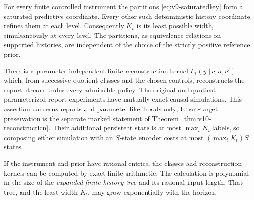 \begin{theorem}
\label{thm:v9-saturation}
For every finite controlled instrument the partitions
\eqref{eq:v9-saturatedkey} form a saturated predictive coordinate. Every
other such deterministic history coordinate refines them at each level.
Consequently $K_t$ is its least possible width, simultaneously at every
level. The partitions, as equivalence relations on supported histories,
are independent of the choice of the strictly positive reference prior.

There is a parameter-independent finite reconstruction kernel
$L_t(y\mid c,a,c')$ which, from successive quotient classes and the
chosen controls, reconstructs the report stream under every admissible
policy. The original and quotient parameterized report experiments have
mutually exact causal simulations. This assertion concerns reports and
parameter likelihoods only; latent-target preservation is the separate
marked statement of Theorem~\ref{thm:v10-reconstruction}. Their additional persistent state is at most
$\max_tK_t$ labels, so composing either simulation with an $S$-state
encoder costs at most $(\max_tK_t)S$ states.

If the instrument and prior have rational entries, the classes and
reconstruction kernels can be computed by exact finite arithmetic.
The calculation is polynomial in the size of the \emph{expanded finite
history tree} and its rational input length. That tree, and the least
width $K_t$, may grow exponentially with the horizon.
\end{theorem}
